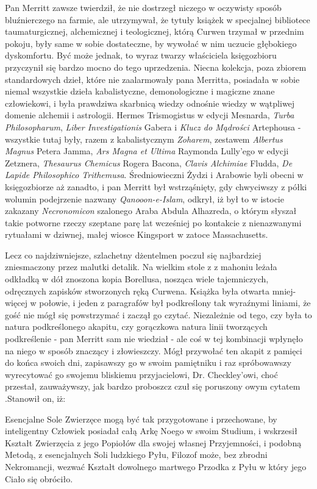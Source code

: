 Pan Merritt zawsze twierdził, że nie dostrzegł niczego w oczywisty sposób bluźnierczego na farmie, ale utrzymywał, że tytuły książek w specjalnej bibliotece taumaturgicznej, alchemicznej i teologicznej, którą Curwen trzymał w przednim pokoju, były same w sobie dostateczne, by wywołać w nim uczucie głębokiego dyskomfortu. Być może jednak, to wyraz twarzy właściciela księgozbioru przyczynił się bardzo mocno do tego uprzedzenia. Niecna kolekcja, poza zbiorem standardowych dzieł, które nie zaalarmowały pana Merritta, posiadała w sobie niemal wszystkie dzieła kabalistyczne, demonologiczne i magiczne znane człowiekowi, i była prawdziwa skarbnicą wiedzy odnośnie wiedzy w wątpliwej domenie alchemii i astrologii. Hermes Trismogistus w edycji Mesnarda, \textit{Turba Philosopharum}, \textit{Liber Investigationis} Gabera i \textit{Klucz do Mądrości} Artephousa - wszystkie tutaj były, razem z kabalistycznym \textit{Zoharem}, zestawem \textit{Albertus Magnus} Petera Jamma, \textit{Ars Magna et Ultima} Raymonda Lully'ego w edycji Zetznera, \textit{Thesaurus Chemicus} Rogera Bacona, \textit{Clavis Alchimiae} Fludda, \textit{De Lapide Philosophico Trithemusa}. Średniowieczni Żydzi i Arabowie byli obecni w księgozbiorze aż zanadto, i pan Merritt był wstrząśnięty, gdy chwyciwszy z półki wolumin podejrzenie nazwany \textit{Qanooon-e-Islam}, odkrył, iż był to w istocie zakazany \textit{Necronomicon} szalonego Araba Abdula Alhazreda, o którym słyszał takie potworne rzeczy szeptane parę lat wcześniej po kontakcie z nienazwanymi rytuałami w dziwnej, małej wiosce Kingsport w zatoce Massachusetts.

Lecz co najdziwniejsze, szlachetny dżentelmen poczuł się najbardziej zniesmaczony przez malutki detalik. Na wielkim stole z z mahoniu leżała odkładką w dół znoszona kopia Borellusa, nosząca wiele tajemniczych, odręcznych zapisków stworzonych ręką Curwena. Książka była otwarta mniej-więcej w połowie, i jeden z paragrafów był podkreślony tak wyraźnymi liniami, że gość nie mógł się powstrzymać i zaczął go czytać. Niezależnie od tego, czy była to natura podkreślonego akapitu, czy gorączkowa natura linii tworzących podkreślenie - pan Merritt sam nie wiedział - ale coś w tej kombinacji wpłynęło na niego w sposób znaczący i złowieszczy. Mógł przywołać ten akapit z pamięci do końca swoich dni, zapisawszy go w swoim pamiętniku i raz spróbowawszy wyrecytować go swojemu bliskiemu przyjacielowi, Dr. Checkley'owi, choć przestał, zauważywszy, jak bardzo proboszcz czuł się poruszony owym cytatem .Stanowił on, iż:

\begin{displayquote}

Esencjalne Sole Zwierzęce mogą być tak przygotowane i przechowane, by inteligentny Człowiek posiadał całą Arkę Noego w swoim Studium, i wskrzesił Kształt Zwierzęcia z jego Popiołów dla swojej własnej Przyjemności, i podobną Metodą, z esencjalnych Soli ludzkiego Pyłu, Filozof może, bez zbrodni Nekromancji, wezwać Kształt dowolnego martwego Przodka z Pyłu w który jego Ciało się obróciło.

\end{displayquote}

